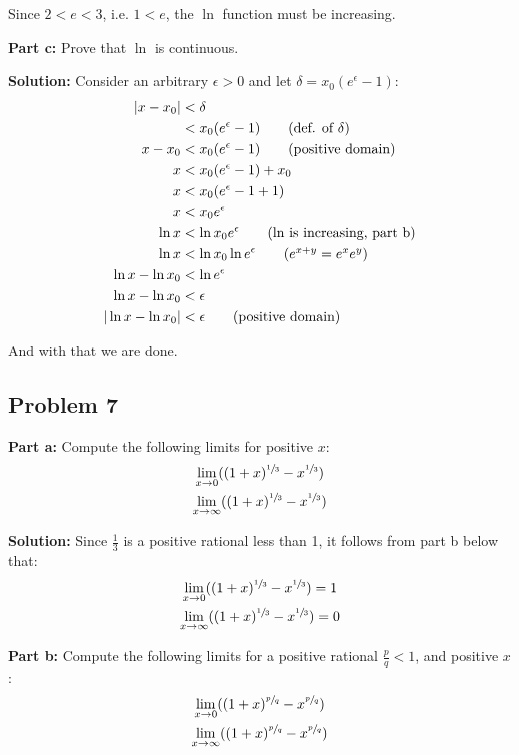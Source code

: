 \documentclass{article}
\begin{document}
Since $2<e<3$, i.e. $1<e$, the $\ln$ function must be increasing.
\bigskip
\bigskip

\noindent\textbf{Part c:} Prove that $\ln$ is continuous.
\bigskip

\noindent\textbf{Solution:} Consider an arbitrary $\epsilon>0$ and let $\delta=x_0(e^\epsilon-1)$:
\begin{align*}
  |x-x_0|&<\delta\\
  &<x_0(e^\epsilon-1)\tag{def. of $\delta$}\\
  x-x_0&<x_0(e^\epsilon-1)\tag{positive domain}\\
  x&<x_0(e^\epsilon-1)+x_0\\
  x&<x_0(e^\epsilon-1+1)\\
  x&<x_0e^\epsilon\\
  \ln x&<\ln x_0e^\epsilon\tag{$\ln$ is increasing, part b}\\
  \ln x&<\ln x_0\ln e^\epsilon\tag{$e^{x+y}=e^xe^y$}\\
  \ln x-\ln x_0&<\ln e^\epsilon\\
  \ln x-\ln x_0&<\epsilon\\
  |\ln x-\ln x_0|&<\epsilon\tag{positive domain}
\end{align*}

And with that we are done.

\subsection*{Problem 7}

\noindent\textbf{Part a:} Compute the following limits for positive $x$:
\begin{gather*}
  \lim_{x\to0} ((1+x)^{\sfrac{1}{3}}-x^{\sfrac{1}{3}})\\
  \lim_{x\to\infty} ((1+x)^{\sfrac{1}{3}}-x^{\sfrac{1}{3}})
\end{gather*}

\noindent\textbf{Solution:} Since $\frac{1}{3}$ is a positive rational less than 1, it follows from part b below that:
\begin{gather*}
  \lim_{x\to0} ((1+x)^{\sfrac{1}{3}}-x^{\sfrac{1}{3}})=1\\
  \lim_{x\to\infty} ((1+x)^{\sfrac{1}{3}}-x^{\sfrac{1}{3}})=0
\end{gather*}
\bigskip

\noindent\textbf{Part b:} Compute the following limits for a positive rational $\frac{p}{q}<1$, and positive $x$:
\begin{gather*}
  \lim_{x\to0} ((1+x)^{\sfrac{p}{q}}-x^{\sfrac{p}{q}})\\
  \lim_{x\to\infty} ((1+x)^{\sfrac{p}{q}}-x^{\sfrac{p}{q}})
\end{gather*}
\end{document}
